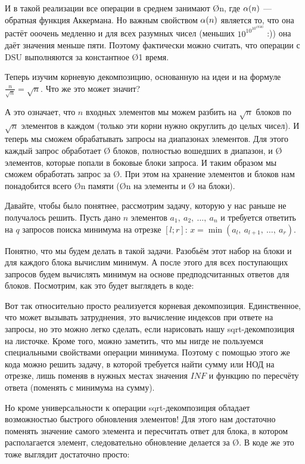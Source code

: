 
И в такой реализации все операции в среднем занимают \O{\ac{n}}, где $\alpha(n)$ — обратная функция Аккермана. Но важным свойством $\alpha(n)$ является то, что она растёт ооочень медленно и для всех разумных чисел (меньших $10^{10^{10^{19500}}}$ :)) она даёт значения меньше пяти. Поэтому фактически можно считать, что операции с DSU выполняются за константное \O{1} время.


Теперь изучим корневую декомпозицию, основанную на идеи  и на формуле $\frac{n}{\sqrt{n}} = \sqrt{n}$. Что же это может значит?

А это означает, что $n$ входных элементов мы можем разбить на $\sqrt{n}$ блоков по $\sqrt{n}$ элементов в каждом (только эти корни нужно округлить до целых чисел). И теперь мы сможем обрабатывать запросы на диапазонах элементов. Для этого каждый запрос обработает \O{} блоков, полностью вошедших в диапазон, и \O{} элементов, которые попали в боковые блоки запроса. И таким образом мы сможем обработать запрос за \O{}. При этом на хранение элементов и блоков нам понадобится всего \O{n} памяти (\O{n} на элементы и \O{} на блоки).

Давайте, чтобы было понятнее, рассмотрим задачу, которую у нас раньше не получалось решить. Пусть дано $n$ элементов $a_1,\ a_2,\ \ldots,\ a_n$ и требуется ответить на $q$ запросов поиска минимума на отрезке $[l; r]$: $x = \min(a_l,\ a_{l + 1},\ \ldots,\ a_r)$.

Понятно, что мы будем делать в такой задачи. Разобьём этот набор на блоки и для каждого блока вычислим минимум. А после этого для всех поступающих запросов будем вычислять минимум на основе предподсчитанных ответов для блоков. Посмотрим, как это будет выглядеть в коде:


Вот так относительно просто реализуется корневая декомпозиция. Единственное, что может вызывать затруднения, это вычисление индексов при ответе на запросы, но это можно легко сделать, если нарисовать нашу sqrt-декомпозиция на листочке. Кроме того, можно заметить, что мы нигде не пользуемся специальными свойствами операции минимума. Поэтому с помощью этого же кода можно решить задачу, в которой требуется найти сумму или НОД на отрезке, лишь поменяв в нужных местах значения $INF$ и функцию по пересчёту ответа (поменять с минимума на сумму).

Но кроме универсальности к операции sqrt-декомпозиция обладает возможностью быстрого обновления элементов! Для этого нам достаточно поменять значение самого элемента и пересчитать ответ для блока, в котором располагается элемент, следовательно обновление делается за \O{}. В коде же это тоже выглядит достаточно просто:

